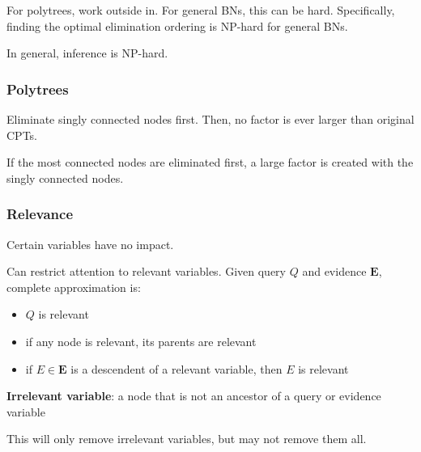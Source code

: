 \documentclass[11pt]{article}
\begin{document}
For polytrees, work outside in.
For general BNs, this can be hard.
Specifically, finding the optimal elimination ordering is NP-hard for general BNs.

In general, inference is NP-hard.
\subsubsection{Polytrees}
\label{sec:orga706720}
Eliminate singly connected nodes first.
Then, no factor is ever larger than original CPTs.

If the most connected nodes are eliminated first, a large factor is created with the singly
connected nodes.
\subsubsection{Relevance}
\label{sec:org9ea955b}
Certain variables have no impact.

Can restrict attention to relevant variables.
Given query \(Q\) and evidence \(\mathbf{E}\), complete approximation is:
\begin{itemize}
\item \(Q\) is relevant
\item if any node is relevant, its parents are relevant
\item if \(E \in \mathbf{E}\) is a descendent of a relevant variable, then \(E\) is relevant
\end{itemize}

\textbf{Irrelevant variable}: a node that is not an ancestor of a query or evidence variable

This will only remove irrelevant variables, but may not remove them all.
\end{document}
